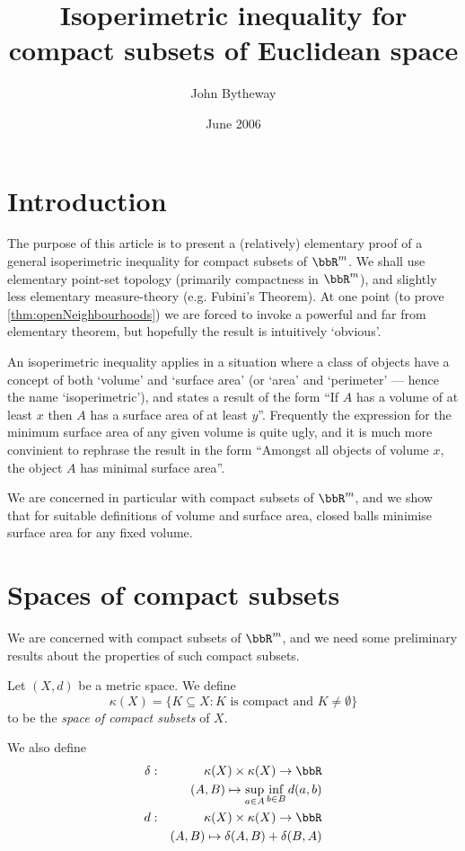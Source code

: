 \documentclass[a4paper,11pt]{article}
\begin{document}
\title{Isoperimetric inequality for compact subsets of Euclidean space}
\author{John Bytheway}
\date{June 2006}
\maketitle

\tableofcontents

\setlength{\parindent}{0pt}
\setlength{\parskip}{1ex plus 0.5ex minus 0.2ex}

\section{Introduction}
The purpose of this article is to present a (relatively) elementary proof of
a general isoperimetric inequality for compact subsets of $\bbR^m$.  We shall
use elementary point-set topology (primarily compactness in $\bbR^m$), and
slightly less elementary measure-theory (e.g. Fubini's Theorem).  At one point
(to prove \vref{thm:openNeighbourhoods}) we are forced to invoke a powerful
and far from elementary theorem, but hopefully the result is intuitively
`obvious'.

An isoperimetric inequality applies in a situation where a class of objects
have a concept of both `volume' and `surface area' (or `area' and `perimeter'
--- hence the name `isoperimetric'), and states a result of the form ``If $A$
has a volume of at least $x$ then $A$ has a surface area of at least $y$''.
Frequently the expression for the minimum surface area of any given volume is
quite ugly, and it is much more convinient to rephrase the result in the form
``Amongst all objects of volume $x$, the object $A$ has minimal surface area''.

We are concerned in particular with compact subsets of $\bbR^m$, and we show
that for suitable definitions of volume and surface area, closed balls minimise
surface area for any fixed volume.

\section{Spaces of compact subsets}
We are concerned with compact subsets of $\bbR^m$, and we need
some preliminary results about the properties of such compact subsets.

\begin{defn}
Let $(X,d)$ be a metric space.  We define
\[
\kappa(X)=\{K\subseteq X:K\textrm{ is compact and }K\not=\emptyset\}
\]
to be the \emph{space of compact subsets} of $X$.

We also define
\begin{eqnarray*}
\delta &:& \kappa(X)\times\kappa(X)\to\bbR \\
&& (A,B)\mapsto \sup_{a\in A}\inf_{b\in B}d(a,b) \\
d &:& \kappa(X)\times\kappa(X)\to\bbR \\
&& (A,B)\mapsto \delta(A,B)+\delta(B,A)
\end{eqnarray*}
\end{defn}
\end{document}
